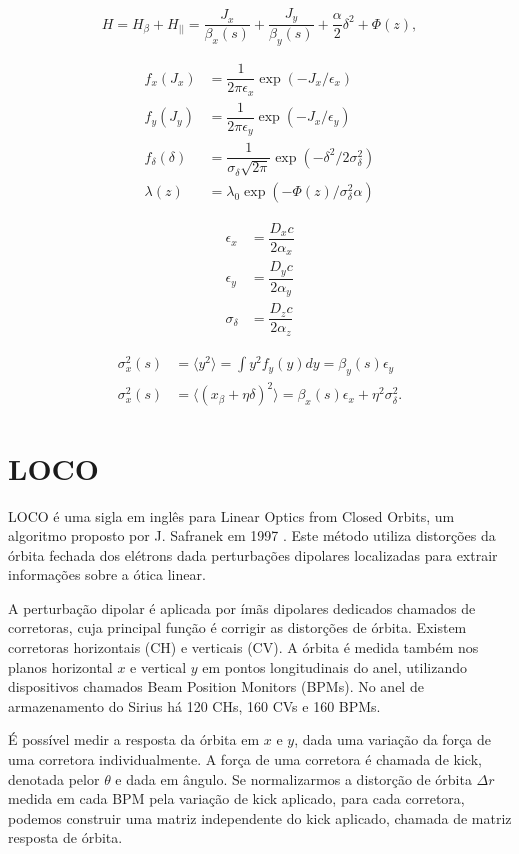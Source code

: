 \[
H = H_\beta + H_{||} =  \dfrac{J_x}{\beta_x(s)} + \dfrac{J_y}{\beta_y(s)} + \dfrac{\alpha}{2}\delta^2 + \Phi(z),
\]


\begin{align}
    f_x(J_x) & = \dfrac{1}{2\pi \epsilon_x}\exp\left(-J_x/\epsilon_x\right) \\
    f_y(J_y) & = \dfrac{1}{2\pi \epsilon_y}\exp\left(-J_x/\epsilon_y\right) \\
    f_{\delta}(\delta) & = \dfrac{1}{\sigma_{\delta}\sqrt{2\pi}}\exp\left(-\delta^2/2\sigma^2_\delta\right) \\
    \lambda(z) & = \lambda_0\exp\left(-\Phi(z)/\sigma^2_\delta\alpha\right)
    \label{dist}
\end{align}

\begin{align}
    \epsilon_x & = \dfrac{D_x c}{2 \alpha_x} \\
    \epsilon_y & = \dfrac{D_y c}{2 \alpha_y} \\
    \sigma_\delta & = \dfrac{D_z c}{2 \alpha_z} 
\end{align}


\begin{align}
    \sigma_x^2(s) & = \langle y^2 \rangle = \int y^2 f_{y}(y) dy = \beta_y(s) \epsilon_y\\
    \sigma_x^2(s) &= \langle \left(x_\beta + \eta \delta \right)^2 \rangle = \beta_x(s) \epsilon_x + \eta^2 \sigma_\delta^2.
\end{align}

\chapter{LOCO}

LOCO é uma sigla em inglês para Linear Optics from Closed Orbits, um algoritmo proposto por J. Safranek em 1997 \cite{safranek}. Este método utiliza distorções da órbita fechada dos elétrons dada perturbações dipolares localizadas para extrair informações sobre a ótica linear. 

A perturbação dipolar é aplicada por ímãs dipolares dedicados chamados de corretoras, cuja principal função é corrigir as distorções de órbita. Existem corretoras horizontais (CH) e verticais (CV). A órbita é medida também nos planos horizontal $x$ e vertical $y$ em pontos longitudinais do anel, utilizando dispositivos chamados Beam Position Monitors (BPMs). No anel de armazenamento do Sirius há 120 CHs, 160 CVs e 160 BPMs.

É possível medir a resposta da órbita em $x$ e $y$, dada uma variação da força de uma corretora individualmente. A força de uma corretora é chamada de kick, denotada pelor $\theta$ e dada em ângulo. Se normalizarmos a distorção de órbita $\Delta r$ medida em cada BPM pela variação de kick aplicado, para cada corretora, podemos construir uma matriz independente do kick aplicado, chamada de matriz resposta de órbita.


